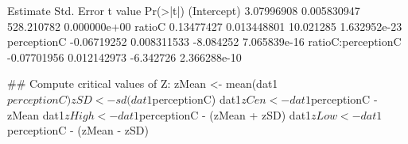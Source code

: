 \begin{Schunk}
\begin{Soutput}
                      Estimate  Std. Error    t value     Pr(>|t|)
(Intercept)         3.07996908 0.005830947 528.210782 0.000000e+00
ratioC              0.13477427 0.013448801  10.021285 1.632952e-23
perceptionC        -0.06719252 0.008311533  -8.084252 7.065839e-16
ratioC:perceptionC -0.07701956 0.012142973  -6.342726 2.366288e-10
\end{Soutput}
\begin{Sinput}
 ## Compute critical values of Z:
 zMean <- mean(dat1$perceptionC)
 zSD <- sd(dat1$perceptionC)
 dat1$zCen <- dat1$perceptionC - zMean 
 dat1$zHigh <- dat1$perceptionC - (zMean + zSD)
 dat1$zLow <- dat1$perceptionC - (zMean - zSD)
\end{Sinput}
\end{Schunk}
